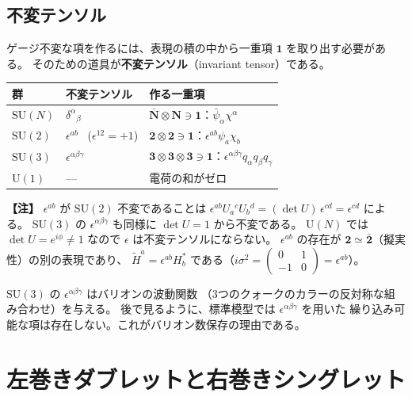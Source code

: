 \documentclass[uplatex,dvipdfmx,a4paper,11pt,openany]{jsbook}
\newcommand{\term}[2]{\textbf{#1}（#2）}
\newenvironment{note}{\vspace{1ex}\par\footnotesize\noindent\textbf{【注】}}{\par\vspace{1ex}}
\numberwithin{equation}{chapter}
\theoremstyle{definition}
\theoremstyle{plain}
\theoremstyle{remark}
\newcommand{\SU}{\mathrm{SU}}
\newcommand{\U}{\mathrm{U}}
\begin{document}
\subsection{不変テンソル}
ゲージ不変な項を作るには、表現の積の中から一重項 $\mathbf1$ を取り出す必要がある。
そのための道具が\term{不変テンソル}{invariant tensor}である。
\begin{center}
\renewcommand{\arraystretch}{1.3}
\begin{tabular}{lll}
\toprule
群 & 不変テンソル & 作る一重項\\
\midrule
$\SU(N)$ & $\delta^\alpha{}_\beta$ & $\bar{\mathbf N}\otimes\mathbf N\ni\mathbf1$：$\bar\psi_\alpha\chi^\alpha$\\
$\SU(2)$ & $\epsilon^{ab}$ \ ($\epsilon^{12}=+1$) & $\mathbf2\otimes\mathbf2\ni\mathbf1$：$\epsilon^{ab}\psi_a\chi_b$\\
$\SU(3)$ & $\epsilon^{\alpha\beta\gamma}$ & $\mathbf3\otimes\mathbf3\otimes\mathbf3\ni\mathbf1$：$\epsilon^{\alpha\beta\gamma}q_\alpha q_\beta q_\gamma$\\
$\U(1)$ & — & 電荷の和がゼロ\\
\bottomrule
\end{tabular}
\end{center}
\begin{note}
$\epsilon^{ab}$ が $\SU(2)$ 不変であることは
$\epsilon^{ab}U_a{}^cU_b{}^d=(\det U)\,\epsilon^{cd}=\epsilon^{cd}$ による。
$\SU(3)$ の $\epsilon^{\alpha\beta\gamma}$ も同様に $\det U=1$ から不変である。
$\U(N)$ では $\det U=e^{i\phi}\ne1$ なので $\epsilon$ は不変テンソルにならない。
$\epsilon^{ab}$ の存在が $\mathbf2\simeq\bar{\mathbf2}$（擬実性）の別の表現であり、
$\tilde H^a=\epsilon^{ab}H^*_b$ である（$i\sigma^2=\begin{pmatrix}0&1\\-1&0\end{pmatrix}=\epsilon^{ab}$）。
\end{note}
$\SU(3)$ の $\epsilon^{\alpha\beta\gamma}$ はバリオンの波動関数
（3つのクォークのカラーの反対称な組み合わせ）を与える。
後で見るように、標準模型では $\epsilon^{\alpha\beta\gamma}$ を用いた
繰り込み可能な項は存在しない。これがバリオン数保存の理由である。
\section{左巻きダブレットと右巻きシングレット}
\label{sec:doublet-singlet}
\end{document}
